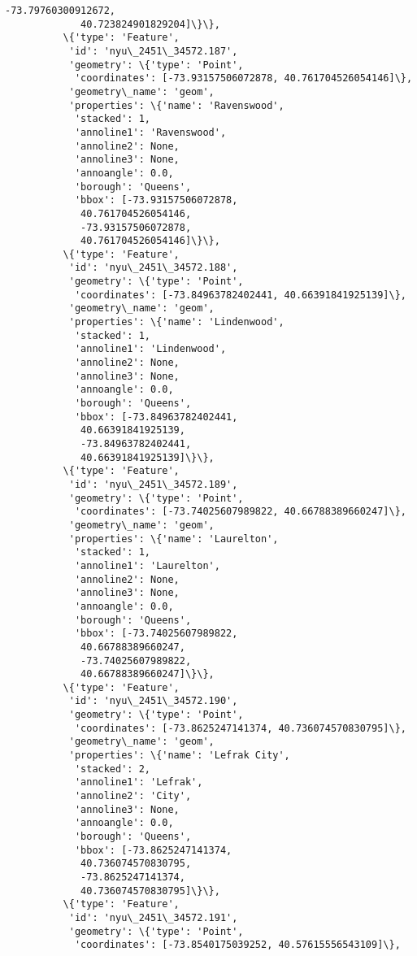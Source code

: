 \documentclass[11pt]{article}
\begin{document}
\begin{Verbatim}[commandchars=\\\{\}]
             -73.79760300912672,
             40.723824901829204]\}\},
          \{'type': 'Feature',
           'id': 'nyu\_2451\_34572.187',
           'geometry': \{'type': 'Point',
            'coordinates': [-73.93157506072878, 40.761704526054146]\},
           'geometry\_name': 'geom',
           'properties': \{'name': 'Ravenswood',
            'stacked': 1,
            'annoline1': 'Ravenswood',
            'annoline2': None,
            'annoline3': None,
            'annoangle': 0.0,
            'borough': 'Queens',
            'bbox': [-73.93157506072878,
             40.761704526054146,
             -73.93157506072878,
             40.761704526054146]\}\},
          \{'type': 'Feature',
           'id': 'nyu\_2451\_34572.188',
           'geometry': \{'type': 'Point',
            'coordinates': [-73.84963782402441, 40.66391841925139]\},
           'geometry\_name': 'geom',
           'properties': \{'name': 'Lindenwood',
            'stacked': 1,
            'annoline1': 'Lindenwood',
            'annoline2': None,
            'annoline3': None,
            'annoangle': 0.0,
            'borough': 'Queens',
            'bbox': [-73.84963782402441,
             40.66391841925139,
             -73.84963782402441,
             40.66391841925139]\}\},
          \{'type': 'Feature',
           'id': 'nyu\_2451\_34572.189',
           'geometry': \{'type': 'Point',
            'coordinates': [-73.74025607989822, 40.66788389660247]\},
           'geometry\_name': 'geom',
           'properties': \{'name': 'Laurelton',
            'stacked': 1,
            'annoline1': 'Laurelton',
            'annoline2': None,
            'annoline3': None,
            'annoangle': 0.0,
            'borough': 'Queens',
            'bbox': [-73.74025607989822,
             40.66788389660247,
             -73.74025607989822,
             40.66788389660247]\}\},
          \{'type': 'Feature',
           'id': 'nyu\_2451\_34572.190',
           'geometry': \{'type': 'Point',
            'coordinates': [-73.8625247141374, 40.736074570830795]\},
           'geometry\_name': 'geom',
           'properties': \{'name': 'Lefrak City',
            'stacked': 2,
            'annoline1': 'Lefrak',
            'annoline2': 'City',
            'annoline3': None,
            'annoangle': 0.0,
            'borough': 'Queens',
            'bbox': [-73.8625247141374,
             40.736074570830795,
             -73.8625247141374,
             40.736074570830795]\}\},
          \{'type': 'Feature',
           'id': 'nyu\_2451\_34572.191',
           'geometry': \{'type': 'Point',
            'coordinates': [-73.8540175039252, 40.57615556543109]\},

\end{Verbatim}
\end{document}

